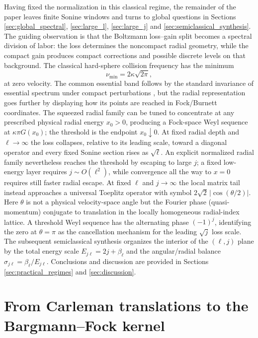 \documentclass[11pt]{article}
\numberwithin{equation}{section}
\theoremstyle{definition}
\begin{document}
Having fixed the normalization in this classical regime, the remainder of the
paper leaves finite Sonine windows and turns to global questions in Sections \ref{sec:global_spectral}, \ref{sec:large_l}, \ref{sec:large_j} and \ref{sec:semiclassical_synthesis}.  The guiding
observation is that the Boltzmann loss--gain split becomes a spectral division
of labor: the loss determines the noncompact radial geometry, while the
compact gain produces compact corrections and possible discrete levels on that
background.  The classical hard-sphere collision frequency has the minimum
\begin{equation}
 \nu_{\min}=2\kappa\sqrt{2\pi},
 \label{eq:intro_numin}
\end{equation}
at zero velocity.  The common essential band follows by the standard invariance
of essential spectrum under compact perturbations \cite{ReedSimon1980},
but the radial representation goes further by displaying how its points are
reached in Fock/Burnett coordinates.  The squeezed radial family can be tuned
to concentrate at any prescribed physical radial energy $x_0>0$, producing a
Fock-space Weyl sequence at $\kappa\pi G(x_0)$; the threshold is the endpoint
$x_0\downarrow0$.  At fixed radial
depth and $\ell\to\infty$ the loss collapses, relative to its leading scale,
toward a diagonal operator and every fixed Sonine section rises as
$\sqrt\ell$.  An explicit normalized radial family nevertheless reaches the
threshold by escaping to large $j$; a fixed low-energy layer requires
$j\sim O(\ell^2)$, while convergence all the way to $x=0$ requires still faster
radial escape.  At fixed $\ell$ and $j\to\infty$ the local matrix tail instead
approaches a universal Toeplitz operator with symbol
$2\sqrt2\,|\cos(\theta/2)|$.  Here $\theta$ is not a physical velocity-space
angle but the Fourier phase (quasi-momentum) conjugate to translation in the
locally homogeneous radial-index lattice.  A threshold Weyl sequence has the
alternating phase $(-1)^j$, identifying the zero at $\theta=\pi$ as the
cancellation mechanism for the leading $\sqrt j$ loss scale.  The subsequent
semiclassical synthesis organizes the interior of the $(\ell,j)$ plane by the
total energy scale $E_{j\ell}=2j+\beta_\ell$ and the angular/radial balance
$\sigma_{j\ell}=\beta_\ell/E_{j\ell}$. Conclusions and discussion are provided in Sections \ref{sec:practical_regimes} and \ref{sec:discussion}.

\section{From Carleman translations to the Bargmann--Fock kernel}
\label{sec:carleman_bargmann}
\end{document}

